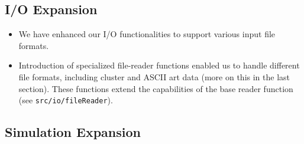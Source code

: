 \documentclass{article}
\begin{document}
\subsection{I/O Expansion}
\label{subsec:file}

\begin{itemize}
    \item We have enhanced our I/O functionalities to support various input file formats.
    \item Introduction of specialized file-reader functions enabled us to handle different file formats, including cluster and ASCII art data (more on this in the last section). These functions extend the capabilities of the base reader function (see \texttt{src/io/fileReader}).
\end{itemize}

\subsection{Simulation Expansion}
\label{subsec:sim}
\end{document}
